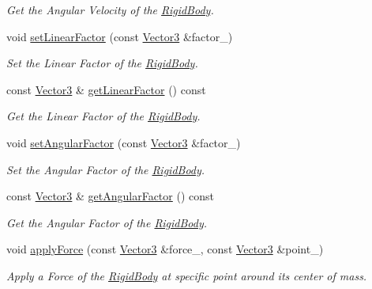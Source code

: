\begin{DoxyCompactItemize}
\begin{DoxyCompactList}\small\item\em Get the Angular Velocity of the \hyperlink{class_magnum_1_1_physics3_1_1_rigid_body}{Rigid\+Body}. \end{DoxyCompactList}\item 
void \hyperlink{class_magnum_1_1_physics3_1_1_vehicle_aade08e94ec789fed968a4dadc76d8c67}{set\+Linear\+Factor} (const \hyperlink{class_magnum_1_1_vector3}{Vector3} \&factor\+\_\+)
\begin{DoxyCompactList}\small\item\em Set the Linear Factor of the \hyperlink{class_magnum_1_1_physics3_1_1_rigid_body}{Rigid\+Body}. \end{DoxyCompactList}\item 
const \hyperlink{class_magnum_1_1_vector3}{Vector3} \& \hyperlink{class_magnum_1_1_physics3_1_1_vehicle_aba7b42207ae8fc4dfa30a6dae6a51827}{get\+Linear\+Factor} () const 
\begin{DoxyCompactList}\small\item\em Get the Linear Factor of the \hyperlink{class_magnum_1_1_physics3_1_1_rigid_body}{Rigid\+Body}. \end{DoxyCompactList}\item 
void \hyperlink{class_magnum_1_1_physics3_1_1_vehicle_a2d91b48481f7652c47ff00b079f9e1b5}{set\+Angular\+Factor} (const \hyperlink{class_magnum_1_1_vector3}{Vector3} \&factor\+\_\+)
\begin{DoxyCompactList}\small\item\em Set the Angular Factor of the \hyperlink{class_magnum_1_1_physics3_1_1_rigid_body}{Rigid\+Body}. \end{DoxyCompactList}\item 
const \hyperlink{class_magnum_1_1_vector3}{Vector3} \& \hyperlink{class_magnum_1_1_physics3_1_1_vehicle_aade1d619f466b2cb3d3d4a6923a9cd36}{get\+Angular\+Factor} () const 
\begin{DoxyCompactList}\small\item\em Get the Angular Factor of the \hyperlink{class_magnum_1_1_physics3_1_1_rigid_body}{Rigid\+Body}. \end{DoxyCompactList}\item 
void \hyperlink{class_magnum_1_1_physics3_1_1_vehicle_a359124c9058b1aa4d35b52146e823178}{apply\+Force} (const \hyperlink{class_magnum_1_1_vector3}{Vector3} \&force\+\_\+, const \hyperlink{class_magnum_1_1_vector3}{Vector3} \&point\+\_\+)
\begin{DoxyCompactList}\small\item\em Apply a Force of the \hyperlink{class_magnum_1_1_physics3_1_1_rigid_body}{Rigid\+Body} at specific point around its center of mass. \end{DoxyCompactList}\item 

\end{DoxyCompactItemize}
